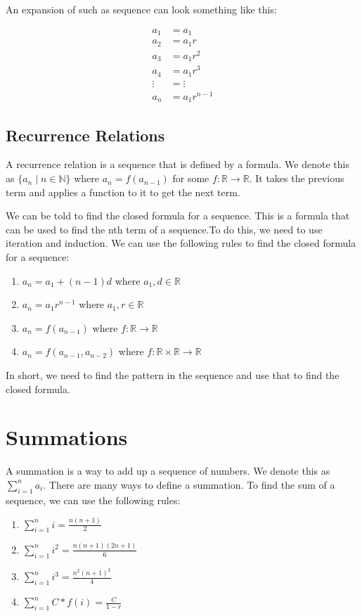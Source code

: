 \documentclass[11pt]{article}
\begin{document}
An expansion of such as sequence can look something like this:

\begin{align}
a_1 &= a_1 \\
a_2 &= a_1 r \\
a_3 &= a_1 r^2 \\
a_4 &= a_1 r^3 \\
\vdots &= \vdots \\
a_n &= a_1 r^{n-1}
\end{align}

\subsection{Recurrence Relations}
\label{sec:orge71ba80}
A recurrence relation is a sequence that is defined by a formula. We denote this as \(\{a_n \mid n \in \mathbb{N}\}\) where \(a_n = f(a_{n-1})\) for some \(f: \mathbb{R} \rightarrow \mathbb{R}\). It takes the previous term and applies a function to it to get the next term.

We can be told to find the closed formula for a sequence. This is a formula that can be used to find the nth term of a sequence.To do this, we need to use iteration and induction. We can use the following rules to find the closed formula for a sequence:
\begin{enumerate}
\item \(a_n = a_1 + (n-1)d\) where \(a_1, d \in \mathbb{R}\)
\item \(a_n = a_1 r^{n-1}\) where \(a_1, r \in \mathbb{R}\)
\item \(a_n = f(a_{n-1})\) where \(f: \mathbb{R} \rightarrow \mathbb{R}\)
\item \(a_n = f(a_{n-1}, a_{n-2})\) where \(f: \mathbb{R} \times \mathbb{R} \rightarrow \mathbb{R}\)
\end{enumerate}

In short, we need to find the pattern in the sequence and use that to find the closed formula.

\section{Summations}
\label{sec:org38d7d53}
A summation is a way to add up a sequence of numbers. We denote this as \(\sum_{i=1}^n a_i\). There are many ways to define a summation. To find the sum of a sequence, we can use the following rules:
\begin{enumerate}
\item \(\sum_{i=1}^n i = \frac{n(n+1)}{2}\)
\item \(\sum_{i=1}^n i^2 = \frac{n(n+1)(2n+1)}{6}\)
\item \(\sum_{i=1}^n i^3 = \frac{n^2(n+1)^2}{4}\)
\item \(\sum_{i=1}^n C * f(i) = \frac{C}{1-r}\)
\end{enumerate}
\end{document}
